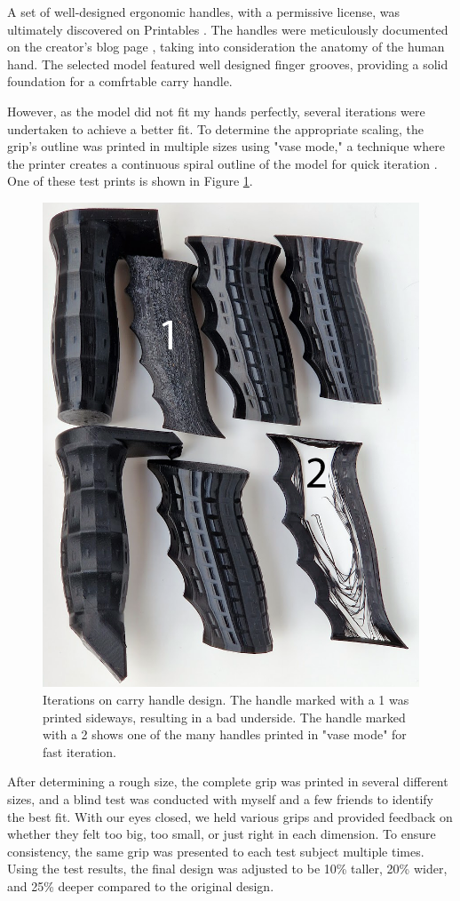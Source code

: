 A set of well-designed ergonomic handles, with a permissive license, was ultimately discovered on Printables \cite{matulichErgonomicHandleBased}.
The handles were meticulously documented on the creator's blog page \cite{matulichWhoseHandsAre2022}, taking into consideration the anatomy of the human hand.
The selected model featured well designed finger grooves, providing a solid foundation for a comfrtable carry handle.



However, as the model did not fit my hands perfectly, several iterations were undertaken to achieve a better fit.
To determine the appropriate scaling, the grip's outline was printed in multiple sizes using "vase mode," a technique where the printer creates a continuous spiral outline of the model for quick iteration \cite{ghargeCuraVaseMode2022}.
One of these test prints is shown in Figure \ref{fig:handle_iteration}.

\begin{figure}[H]
    \centering
    \includegraphics[width=.5\textwidth]{figures/3d_print/handles.png}
    \caption{Iterations on carry handle design.
        The handle marked with a 1 was printed sideways, resulting in a bad underside.
        The handle marked with a 2 shows one of the many handles printed in "vase mode" for fast iteration.}
    \label{fig:handle_iteration}
\end{figure}



After determining a rough size, the complete grip was printed in several different sizes, and a blind test was conducted with myself and a few friends to identify the best fit.
With our eyes closed, we held various grips and provided feedback on whether they felt too big, too small, or just right in each dimension.
To ensure consistency, the same grip was presented to each test subject multiple times.
Using the test results, the final design was adjusted to be 10\% taller, 20\% wider, and 25\% deeper compared to the original design.

